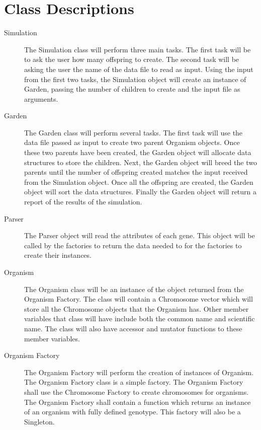 \documentclass{article}
\begin{document}
\newpage
\section{Class Descriptions}
\begin{description}

\item[Simulation] The Simulation class will perform three main tasks. The first task will be to ask the user how many offspring to create. The second task will be asking the user the name of the data file to read as input. Using the input from the first two tasks, the Simulation object will create an instance of Garden, passing the number of children to create and the input file as arguments.

\item[Garden] The Garden class will perform several tasks. The first task will use the data file passed as input to create two parent Organism objects. Once these two parents have been created, the Garden object will allocate data structures to store the children. Next, the Garden object will breed the two parents until the number of offspring created matches the input received from the Simulation object. Once all the offspring are created, the Garden object will sort the data structures. Finally the Garden object will return a report of the results of the simulation.

\item[Parser] The Parser object will read the attributes of each gene. This object will be called by the factories to return the data needed to for the factories to create their instances.

\item[Organism] The Organism class will be an instance of the object returned from the Organism Factory. The class will contain a Chromosome vector which will store all the Chromosome objects that the Organism has. Other member variables that class will have include both the common name and scientific name. The class will also have accessor and mutator functions to these member variables.

\item[Organism Factory]The Organism Factory will perform the creation of instances of Organism. The Organism Factory class is a simple factory. The Organism Factory shall use the Chromosome Factory to create chromosomes for organisms. The Organism Factory shall contain a function which returns an instance of an organism with fully defined genotype. This factory will also be a Singleton.


\end{description}
\end{document}
